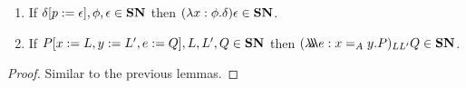 



\begin{lemma}
\label{lm:SNothers}
$ $
\begin{enumerate}
\item
If $\delta[p:=\epsilon], \phi, \epsilon \in \mathbf{SN}$ then $(\lambda x:\phi.\delta)\epsilon \in \mathbf{SN}$.
\item
If $P[x:=L, y:=L', e:=Q], L, L', Q \in \mathbf{SN}$ then $(\lambda \!\! \lambda \!\! \lambda e:x =_A y.P)_{L L'} Q \in \mathbf{SN}$.
\end{enumerate}
\end{lemma}

\begin{proof}
Similar to the previous lemmas.
\end{proof}